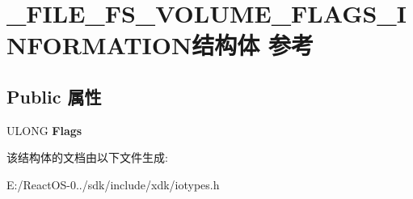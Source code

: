 \hypertarget{struct___f_i_l_e___f_s___v_o_l_u_m_e___f_l_a_g_s___i_n_f_o_r_m_a_t_i_o_n}{}\section{\+\_\+\+F\+I\+L\+E\+\_\+\+F\+S\+\_\+\+V\+O\+L\+U\+M\+E\+\_\+\+F\+L\+A\+G\+S\+\_\+\+I\+N\+F\+O\+R\+M\+A\+T\+I\+O\+N结构体 参考}
\label{struct___f_i_l_e___f_s___v_o_l_u_m_e___f_l_a_g_s___i_n_f_o_r_m_a_t_i_o_n}
\subsection*{Public 属性}
\begin{DoxyCompactItemize}
\item 
\mbox{\label{struct___f_i_l_e___f_s___v_o_l_u_m_e___f_l_a_g_s___i_n_f_o_r_m_a_t_i_o_n_adda78d87a2d1fdd308a2ff8b8ec23a36}} 
U\+L\+O\+NG {\bfseries Flags}
\end{DoxyCompactItemize}


该结构体的文档由以下文件生成\+:\begin{DoxyCompactItemize}
\item 
E\+:/\+React\+O\+S-\/0../sdk/include/xdk/iotypes.\+h\end{DoxyCompactItemize}

